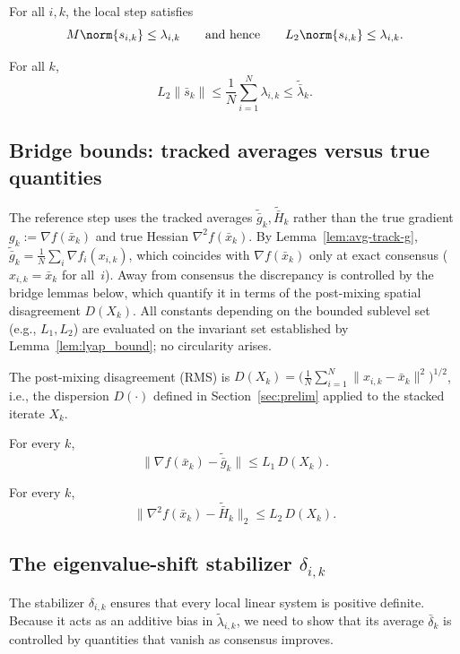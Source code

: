 \documentclass[review,onefignum,onetabnum]{siamart171218}
\begin{document}
	\begin{lemma}\label{lem:M-vs-s}
		For all $i,k$, the local step satisfies
		\[
		M\norm{s_{i,k}}\le \lambda_{i,k}
		\qquad\text{and hence}\qquad
		L_2\norm{s_{i,k}}\le \lambda_{i,k}.
		\]
	\end{lemma}
	
	\begin{lemma}\label{lem:avg-regime}
		For all $k$,
		\[
		L_2\|\bar s_k\|\le \frac1N\sum_{i=1}^N \lambda_{i,k}\le \tilde{\bar\lambda}_k.
		\]
	\end{lemma}
	
	\subsection{Bridge bounds: tracked averages versus true quantities}\label{ssec:bridge}
	The reference step uses the tracked averages
	$\tilde{\bar g}_k,\tilde{\bar H}_k$ rather than the true gradient
	$g_k:=\nabla f(\bar x_k)$ and true Hessian
	$\nabla^2 f(\bar x_k)$.
	By Lemma~\ref{lem:avg-track-g},
	$\tilde{\bar g}_k = \frac{1}{N}\sum_{i}\nabla f_i(x_{i,k})$,
	which coincides with $\nabla f(\bar x_k)$ only at exact
	consensus ($x_{i,k}=\bar x_k$ for all~$i$).
	Away from consensus the discrepancy is controlled by the
	bridge lemmas below, which quantify it in terms of the
	post-mixing spatial disagreement $D(X_k)$.
	All constants depending on the bounded sublevel set
	(e.g., $L_1,L_2$) are evaluated on the invariant set
	established by Lemma~\ref{lem:lyap_bound}; no circularity arises.
	
	The post-mixing disagreement (RMS) is
	$D(X_k)=\bigl(\frac1N\sum_{i=1}^N \|x_{i,k}-\bar x_k\|^2\bigr)^{1/2}$,
	i.e., the dispersion $D(\cdot)$ defined in Section~\ref{sec:prelim}
	applied to the stacked iterate $X_k$.
	
	\begin{lemma}\label{lem:bridge-grad}
		For every $k$,
		\[
		\|\nabla f(\bar x_k)-\tilde{\bar g}_k\|\le L_1\,D(X_k).
		\]
	\end{lemma}
	
	\begin{lemma}\label{lem:bridge-hess}
		For every $k$,
		\[
		\|\nabla^2 f(\bar x_k)-\tilde{\bar H}_k\|_2\le L_2\,D(X_k).
		\]
	\end{lemma}
	
	\subsection{The eigenvalue-shift stabilizer \texorpdfstring{$\delta_{i,k}$}{delta\_ik}}\label{ssec:stab}
	The stabilizer $\delta_{i,k}$ ensures that every local linear system
	is positive definite.
	Because it acts as an additive bias in $\tilde\lambda_{i,k}$, we need
	to show that its average $\bar\delta_k$ is controlled by quantities
	that vanish as consensus improves.
	
\end{document}
